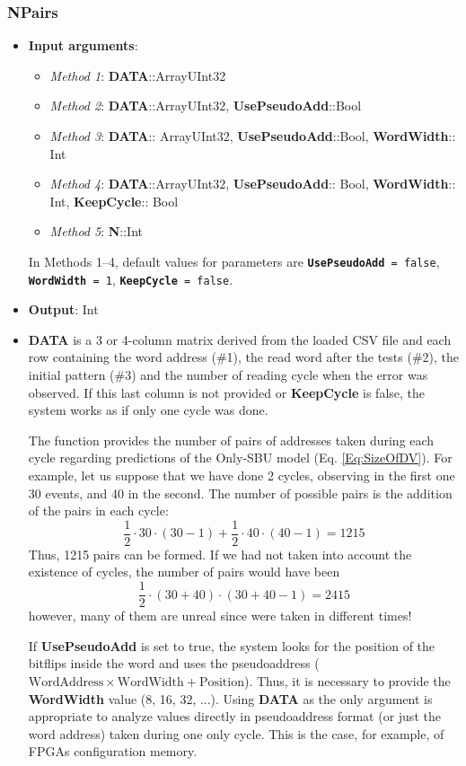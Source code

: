 \subsubsection*{NPairs}\label{Func:Npairs}
\begin{itemize}
	\item \textbf{Input arguments}:
	\begin{itemize}
		\item \textit{Method 1}: \textbf{DATA}::Array{UInt32}
		\item \textit{Method 2}: \textbf{DATA}::Array{UInt32}, \textbf{UsePseudoAdd}::Bool
		\item \textit{Method 3}: \textbf{DATA}:: Array{UInt32}, \textbf{UsePseudoAdd}::Bool, \textbf{WordWidth}:: Int
		\item \textit{Method 4}: \textbf{DATA}::Array{UInt32}, \textbf{UsePseudoAdd}:: Bool, \textbf{WordWidth}:: Int, \textbf{KeepCycle}:: Bool
		\item \textit{Method 5}: \textbf{N}::Int
	\end{itemize}

	In Methods 1--4, default values for parameters are \texttt{\textbf{UsePseudoAdd} = false}, \texttt{\textbf{WordWidth} = 1}, \texttt{\textbf{KeepCycle} = false}. 
	
	\item \textbf{Output}: Int 
	\item \textbf{DATA} is a 3 or 4-column matrix derived from the loaded CSV file and each row containing the word address (\#1), the read word after the tests (\#2), the initial pattern (\#3) and the number of reading cycle when the error was observed. If this last column is not provided or \textbf{KeepCycle} is false, the system works as if only one cycle was done. 
	
	The function provides the number of pairs of addresses taken during each cycle regarding predictions of the Only-SBU model (Eq. \ref{Eq:SizeOfDV}). For example, let us suppose that we have done 2 cycles, observing in the first one 30 events, and 40 in the second. The number of possible pairs is the addition of the pairs in each cycle:
	\[
	\frac{1}{2}\cdot 30\cdot(30-1)+\frac{1}{2}\cdot 40\cdot(40-1) = 1215
	\]
	Thus, 1215 pairs can be formed. If we had not taken into account the existence of cycles, the number of pairs would have been\[	\frac{1}{2}\cdot (30+40)\cdot(30+40-1) = 2415\]
	however, many of them are unreal since were taken in different times!
	
	If \textbf{UsePseudoAdd} is set to true, the system looks for the position of the bitflips inside the word and uses the pseudoaddress (\(\text{WordAddress}\times\text{WordWidth}+\text{Position}\)). Thus, it is necessary to provide the \textbf{WordWidth} value (8, 16, 32, ...). Using \textbf{DATA} as the only argument is appropriate to analyze values directly in pseudoaddress format (or just the word address) taken during one only cycle. This is the case, for example, of FPGAs configuration memory. 
	

\end{itemize}

